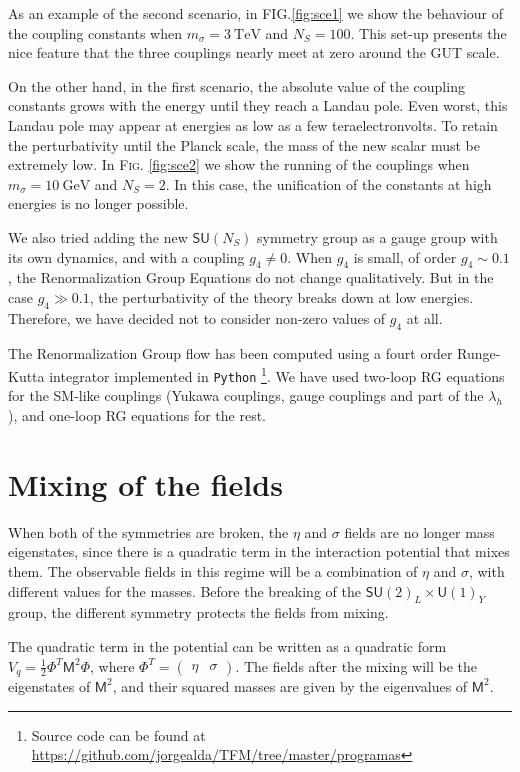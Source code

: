 \documentclass[aps,prd,preprintnumbers,nofootinbibn,twocolumn]{revtex4}
\begin{document}
As an example of the second scenario, in \textsc{FIG.}\ref{fig:sce1} we show the behaviour of the coupling constants when $m_\sigma = \SI{3}{\tera\electronvolt}$ and $N_S = 100$. This set-up presents the nice feature that the three couplings nearly meet at zero around the GUT scale.



On the other hand, in the first scenario, the absolute value of the coupling constants grows with the energy until they reach a Landau pole. Even worst, this Landau pole may appear at energies as low as a few teraelectronvolts. To retain the perturbativity until the Planck scale, the mass of the new scalar must be extremely low. In \textsc{Fig.} \ref{fig:sce2} we show the running of the couplings when $m_\sigma =\SI{10}{\giga\electronvolt}$ and $N_S = 2$. In this case, the unification of the constants at high energies is no longer possible.

We also tried adding the new $\mathsf{SU}(N_S)$ symmetry group as a gauge group with its own dynamics, and with a coupling $g_4\neq 0$. When $g_4$ is small, of order $g_4\sim 0.1$, the Renormalization Group Equations do not change qualitatively. But in the case $g_4 \gg 0.1$, the perturbativity of the theory breaks down at low energies. Therefore, we have decided not to consider non-zero values of $g_4$ at all.

The Renormalization Group flow has been computed using a fourt order Runge-Kutta integrator implemented in \texttt{Python} \footnote{Source code can be found at \url{https://github.com/jorgealda/TFM/tree/master/programas}}. We have used two-loop RG equations for the SM-like couplings (Yukawa couplings, gauge couplings and part of the $\lambda_h$)\cite{Arason:1991ic}, and one-loop RG equations for the rest.

\section{Mixing of the fields} \label{sec:mixing}


When both of the symmetries are broken, the $\eta$ and $\sigma$ fields are no longer mass eigenstates, since there is a quadratic term in the interaction potential that mixes them. The observable fields in this regime will be a combination of $\eta$ and $\sigma$, with different values for the masses. Before the breaking of the $\mathsf{SU}(2)_L\times \mathsf{U}(1)_Y$ group, the different symmetry protects the fields from mixing.

The quadratic term in the potential can be written as a quadratic form $V_q = \frac{1}{2}\Phi^T \mathsf{M}^2 \Phi$, where $\Phi^T = \begin{pmatrix}\eta & \sigma \end{pmatrix} $. The fields after the mixing will be the eigenstates of $\mathsf{M}^2$, and their squared masses are given by the eigenvalues of $\mathsf{M}^2$.
\end{document}
